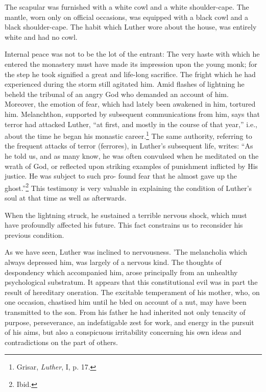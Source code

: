 The scapular was furnished with a white cowl and a white shoulder-cape. The mantle, worn only on official occasions, was equipped with
a black cowl and a black shoulder-cape. The habit which Luther
wore about the house, was entirely white and had no cowl.

Internal peace was not to be the lot of the entrant: The very haste
with which he entered the monastery must have made its impression
upon the young monk; for the step he took signified a great and
life-long sacrifice. The fright which he had experienced during the
storm still agitated him. Amid flashes of lightning he beheld the
tribunal of an angry God who demanded an account of him. Moreover,
the emotion of fear, which had lately been awakened in him,
tortured him. Melanchthon, supported by subsequent communications
from him, says that terror had attacked Luther, “at first, and
mostly in the course of that year,” i.e., about the time he began his monastic career.\footnote
{Grisar, \textit{Luther}, I, p. 17.}
The same authority, referring to the frequent attacks of terror (ferrores), in Luther’s
subsequent life, writes: “As he told us, and as many know, he was often convulsed when he meditated on the wrath of God, or reflected upon striking examples of punishment inflicted by His justice. He was subject to such pro- found fear that he almost gave up the ghost.”\footnote{Ibid.}
This testimony is very valuable in explaining the condition of Luther’s soul at that time as well as afterwards.

When the lightning struck, he sustained a terrible nervous shock, which must have profoundly affected his future.
This fact constrains us to reconsider his previous condition.

As we have seen, Luther was inclined to nervousness. 'The melancholia
which always depressed him, was largely of a nervous kind. The thoughts
of despondency which accompanied him, arose principally from an unhealthy
psychological substratum. It appears that this constitutional evil was
in part the result of hereditary oneration. The excitable temperament of
his mother, who, on one occasion, chastised him until he bled on account of a nut, may have
been transmitted to the son. From his father he had inherited not
only tenacity of purpose, perseverance, an indefatigable zest for
work, and energy in the pursuit of his aims, but also a conspicuous
irritability concerning his own ideas and contradictions on the part
of others.

